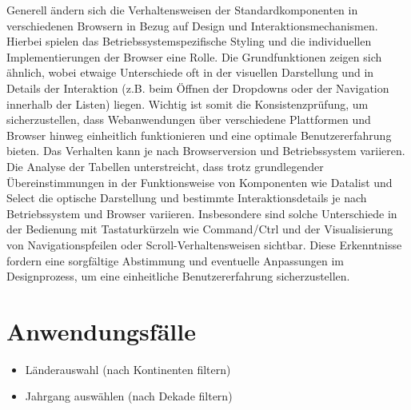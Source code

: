 Generell ändern sich die Verhaltensweisen der Standardkomponenten in verschiedenen Browsern in Bezug auf Design und Interaktionsmechanismen. 
Hierbei spielen das Betriebssystemspezifische Styling und die individuellen Implementierungen der Browser eine Rolle. Die Grundfunktionen zeigen sich ähnlich, 
wobei etwaige Unterschiede oft in der visuellen Darstellung und in Details der Interaktion (z.B. beim Öffnen der Dropdowns oder der Navigation innerhalb der Listen) liegen. 
Wichtig ist somit die Konsistenzprüfung, um sicherzustellen, dass Webanwendungen über verschiedene Plattformen und Browser hinweg einheitlich funktionieren und eine optimale Benutzererfahrung bieten. 
Das Verhalten kann je nach Browserversion und Betriebssystem variieren. Die Analyse der Tabellen unterstreicht, dass trotz grundlegender Übereinstimmungen in der Funktionsweise von Komponenten wie Datalist und Select 
die optische Darstellung und bestimmte Interaktionsdetails je nach Betriebssystem und Browser variieren. 
Insbesondere sind solche Unterschiede in der Bedienung mit Tastaturkürzeln wie Command/Ctrl und der Visualisierung von Navigationspfeilen oder Scroll-Verhaltensweisen sichtbar. 
Diese Erkenntnisse fordern eine sorgfältige Abstimmung und eventuelle Anpassungen im Designprozess, um eine einheitliche Benutzererfahrung sicherzustellen.


\section{Anwendungsfälle}
\begin{itemize}
    \item Länderauswahl (nach Kontinenten filtern)
    \item Jahrgang auswählen (nach Dekade filtern)
\end{itemize}
